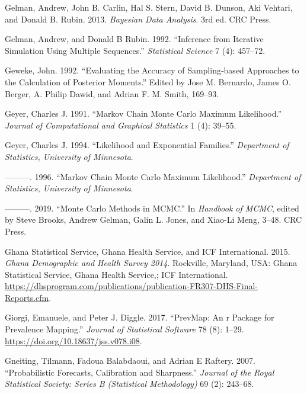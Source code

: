 \documentclass[
  letterpaper,
]{krantz}
\newlength{\cslhangindent}
\newenvironment{CSLReferences}[2] %
 {\begin{list}{}{%
  \setlength{\itemindent}{0pt}
  \setlength{\leftmargin}{0pt}
  \setlength{\parsep}{0pt}
  \ifodd #1
   \setlength{\leftmargin}{\cslhangindent}
   \setlength{\itemindent}{-1\cslhangindent}
  \fi
  \setlength{\itemsep}{#2\baselineskip}}}
 {\end{list}}
\begin{document}
\begin{CSLReferences}{1}{0}
Gelman, Andrew, John B. Carlin, Hal S. Stern, David B. Dunson, Aki
Vehtari, and Donald B. Rubin. 2013. \emph{Bayesian Data Analysis}. 3rd
ed. CRC Press.

Gelman, Andrew, and Donald B Rubin. 1992. {``Inference from Iterative
Simulation Using Multiple Sequences.''} \emph{Statistical Science} 7
(4): 457--72.

Geweke, John. 1992. {``Evaluating the Accuracy of Sampling‐based
Approaches to the Calculation of Posterior Moments.''} Edited by Jose M.
Bernardo, James O. Berger, A. Philip Dawid, and Adrian F. M. Smith,
169--93.

Geyer, Charles J. 1991. {``Markov Chain Monte Carlo Maximum
Likelihood.''} \emph{Journal of Computational and Graphical Statistics}
1 (4): 39--55.

Geyer, Charles J. 1994. {``Likelihood and Exponential Families.''}
\emph{Department of Statistics, University of Minnesota}.

---------. 1996. {``Markov Chain Monte Carlo Maximum Likelihood.''}
\emph{Department of Statistics, University of Minnesota}.

---------. 2019. {``Monte Carlo Methods in MCMC.''} In \emph{Handbook of
MCMC}, edited by Steve Brooks, Andrew Gelman, Galin L. Jones, and
Xiao-Li Meng, 3--48. CRC Press.

Ghana Statistical Service, Ghana Health Service, and ICF International.
2015. \emph{Ghana Demographic and Health Survey 2014}. Rockville,
Maryland, USA: Ghana Statistical Service, Ghana Health Service,; ICF
International.
\url{https://dhsprogram.com/publications/publication-FR307-DHS-Final-Reports.cfm}.

Giorgi, Emanuele, and Peter J. Diggle. 2017. {``PrevMap: An r Package
for Prevalence Mapping.''} \emph{Journal of Statistical Software} 78
(8): 1--29. \url{https://doi.org/10.18637/jss.v078.i08}.

Gneiting, Tilmann, Fadoua Balabdaoui, and Adrian E Raftery. 2007.
{``Probabilistic Forecasts, Calibration and Sharpness.''} \emph{Journal
of the Royal Statistical Society: Series B (Statistical Methodology)} 69
(2): 243--68.


\end{CSLReferences}
\end{document}
